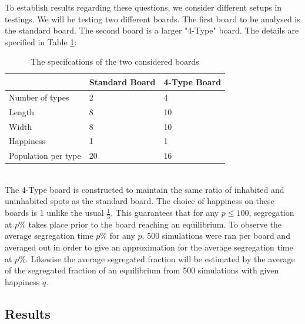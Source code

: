 To establish results regarding these questions, we consider different setups in testings. We will be testing two different boards.
The first board to be analysed is the standard board. The second board is a larger 
"4-Type" board. The details are specified in Table \ref{tab:specs}:
\begin{table}[h!]
\centering
\caption{The specifcations of the two considered boards}
\label{tab:specs}
\begin{tabular}{l|l|l}
  & Standard Board & 4-Type Board\\ \hline
Number of types & 2 & 4 \\ 
 Length & 8 & 10  \\
 Width & 8 & 10  \\
 Happiness & 1 & 1  \\
Population per type & 20 & 16  
\end{tabular}
\end{table}
\\
The 4-Type board is constructed to maintain the same ratio of inhabited and uninhabited spots as the standard board. The choice of happiness on these boards is 1 unlike the usual \(\frac{1}{3}\). 
This guarantees that for any \(p\leq 100\), segregation at \(p\%\) takes place prior to the board reaching an equilibrium. 
To observe the average segregation time \(p\%\) for any \(p\), 500 simulations were ran per board and averaged out in order to give an approximation for the average segregation time at \(p\%\).
Likewise the average segregated fraction will be estimated by the average of the segregated fraction of an equilibrium from 500 simulations with given happiness \(q\).

\subsection{Results}

